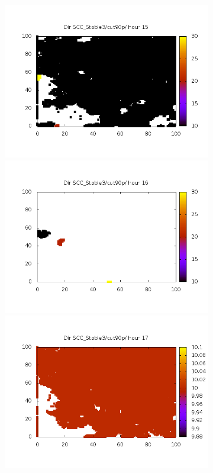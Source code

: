 \documentclass[10pt,a4paper]{article}
\begin{document}
\begin{figure}
\begin{subfigure}[b]{1\textwidth}
\includegraphics[scale=.20]{./img/SCC_Stable3/cut90p/15.png}
\includegraphics[scale=.20]{./img/SCC_Stable3/cut90p/16.png}
\includegraphics[scale=.20]{./img/SCC_Stable3/cut90p/17.png}
\end{subfigure}


\end{figure}
\end{document}
